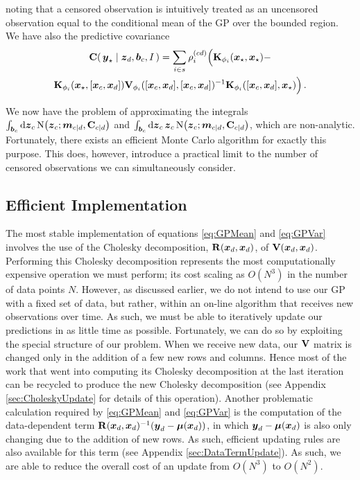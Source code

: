 \documentclass{acmtrans2m}
\begin{document}
noting that a censored observation is intuitively treated as an uncensored observation equal to the conditional mean of the GP over the bounded region. We have also the predictive covariance
\begin{multline} \label{eq:CensoredCov}
\mathbf{C}\!\left(\,\boldsymbol{y}_\star\mid\boldsymbol{z}_d,\boldsymbol{b}_c,I\,\right)=\sum_{i\in s}\rho^{(cd)}_i \Big(\mathbf{K}_{\phi_i}(\boldsymbol{x}_\star,\boldsymbol{x}_\star)-\\\mathbf{K}_{\phi_i}(\boldsymbol{x}_\star,[\boldsymbol{x}_c,\boldsymbol{x}_d])\mathbf{V}_{\phi_i}([\boldsymbol{x}_c,\boldsymbol{x}_d],[\boldsymbol{x}_c,\boldsymbol{x}_d])^{-1}\mathbf{K}_{\phi_i}([\boldsymbol{x}_c,\boldsymbol{x}_d],\boldsymbol{x}_\star)\Big)\,.
\end{multline}

We now have the problem of approximating the integrals $\int_{\boldsymbol{b}_c}\mathrm{d}\boldsymbol{z}_c\,\text{N}\!\left(\boldsymbol{z}_c;\boldsymbol{m}_{c|d},\mathbf{C}_{c|d}\right)$ and $\int_{\boldsymbol{b}_c}\mathrm{d}\boldsymbol{z}_c\,\boldsymbol{z}_c\, \text{N}\!\left(\boldsymbol{z}_c;\boldsymbol{m}_{c|d},\mathbf{C}_{c|d}\right)$, which are non-analytic. Fortunately, there exists an efficient Monte Carlo algorithm \cite{genz1992ncm} for exactly this purpose. This does, however, introduce a practical limit to the number of censored observations we can simultaneously consider.

\subsection{Efficient Implementation}\label{sec_efficient}

\noindent The most stable implementation of equations \eqref{eq:GPMean} and \eqref{eq:GPVar} involves the use of the Cholesky decomposition, $\mathbf{R}(\boldsymbol{x}_d,\boldsymbol{x}_d)$, of $\mathbf{V}(\boldsymbol{x}_d,\boldsymbol{x}_d)$. %
Performing this Cholesky decomposition represents the most computationally expensive operation we must perform; its cost scaling as $O(N^3)$ in the number of data points $N$. However, as discussed earlier, we do not intend to use our GP with a fixed set of data, but rather, within an on-line algorithm that receives new observations over time. As such, we must be able to iteratively update our predictions in as little time as possible. Fortunately, we can do so by exploiting the special structure of our problem. When we receive new data, our $\mathbf{V}$ matrix is changed only in the addition of a few new rows and columns. Hence most of the work that went into computing its Cholesky decomposition at the last iteration can be recycled to produce the new Cholesky decomposition (see Appendix \ref{sec:CholeskyUpdate} for details of this operation). Another problematic calculation required by \eqref{eq:GPMean} and \eqref{eq:GPVar} is the computation of the data-dependent term $\mathbf{R}(\boldsymbol{x}_d,\boldsymbol{x}_d)^{-1}(\boldsymbol{y}_d-\boldsymbol{\mu}(\boldsymbol{x}_d))$, in which $\boldsymbol{y}_d-\boldsymbol{\mu}(\boldsymbol{x}_d)$ is also only changing due to the addition of new rows. As such, efficient updating rules are also available for this term (see Appendix \ref{sec:DataTermUpdate}). As such, we are able to reduce the overall cost of an update from $O(N^3)$ to $O(N^2)$.
\end{document}
